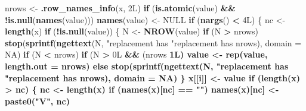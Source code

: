\documentclass[]{book}
\newenvironment{Shaded}{\begin{snugshade}}{\end{snugshade}}
\newcommand{\ControlFlowTok}[1]{\textcolor[rgb]{0.13,0.29,0.53}{\textbf{#1}}}
\newcommand{\DataTypeTok}[1]{\textcolor[rgb]{0.13,0.29,0.53}{#1}}
\newcommand{\KeywordTok}[1]{\textcolor[rgb]{0.13,0.29,0.53}{\textbf{#1}}}
\newcommand{\NormalTok}[1]{#1}
\newcommand{\OperatorTok}[1]{\textcolor[rgb]{0.81,0.36,0.00}{\textbf{#1}}}
\newcommand{\OtherTok}[1]{\textcolor[rgb]{0.56,0.35,0.01}{#1}}
\newcommand{\StringTok}[1]{\textcolor[rgb]{0.31,0.60,0.02}{#1}}
\begin{document}
\begin{Shaded}
\begin{Highlighting}[]
\NormalTok{nrows <-}\StringTok{ }\KeywordTok{.row_names_info}\NormalTok{(x, 2L)}
  \ControlFlowTok{if}\NormalTok{ (}\KeywordTok{is.atomic}\NormalTok{(value) }\OperatorTok{&&}\StringTok{ }\OperatorTok{!}\KeywordTok{is.null}\NormalTok{(}\KeywordTok{names}\NormalTok{(value))) }
    \KeywordTok{names}\NormalTok{(value) <-}\StringTok{ }\OtherTok{NULL}
  \ControlFlowTok{if}\NormalTok{ (}\KeywordTok{nargs}\NormalTok{() }\OperatorTok{<}\StringTok{ }\NormalTok{4L) \{}
\NormalTok{    nc <-}\StringTok{ }\KeywordTok{length}\NormalTok{(x)}
    \ControlFlowTok{if}\NormalTok{ (}\OperatorTok{!}\KeywordTok{is.null}\NormalTok{(value)) \{}
\NormalTok{      N <-}\StringTok{ }\KeywordTok{NROW}\NormalTok{(value)}
      \ControlFlowTok{if}\NormalTok{ (N }\OperatorTok{>}\StringTok{ }\NormalTok{nrows) }
        \KeywordTok{stop}\NormalTok{(}\KeywordTok{sprintf}\NormalTok{(}\KeywordTok{ngettext}\NormalTok{(N, }\StringTok{"replacement has %
          \StringTok{"replacement has %
\NormalTok{          nrows), }\DataTypeTok{domain =} \OtherTok{NA}\NormalTok{)}
      \ControlFlowTok{if}\NormalTok{ (N }\OperatorTok{<}\StringTok{ }\NormalTok{nrows) }
        \ControlFlowTok{if}\NormalTok{ (N }\OperatorTok{>}\StringTok{ }\NormalTok{0L }\OperatorTok{&&}\StringTok{ }\NormalTok{(nrows}\OperatorTok{%
\StringTok{          }\NormalTok{1L) }
\NormalTok{          value <-}\StringTok{ }\KeywordTok{rep}\NormalTok{(value, }\DataTypeTok{length.out =}\NormalTok{ nrows)}
        \ControlFlowTok{else} \KeywordTok{stop}\NormalTok{(}\KeywordTok{sprintf}\NormalTok{(}\KeywordTok{ngettext}\NormalTok{(N, }\StringTok{"replacement has %
          \StringTok{"replacement has %
\NormalTok{          nrows), }\DataTypeTok{domain =} \OtherTok{NA}\NormalTok{)}
\NormalTok{    \}}
\NormalTok{    x[[i]] <-}\StringTok{ }\NormalTok{value}
    \ControlFlowTok{if}\NormalTok{ (}\KeywordTok{length}\NormalTok{(x) }\OperatorTok{>}\StringTok{ }\NormalTok{nc) \{}
\NormalTok{      nc <-}\StringTok{ }\KeywordTok{length}\NormalTok{(x)}
      \ControlFlowTok{if}\NormalTok{ (}\KeywordTok{names}\NormalTok{(x)[nc] }\OperatorTok{==}\StringTok{ ""}\NormalTok{) }
        \KeywordTok{names}\NormalTok{(x)[nc] <-}\StringTok{ }\KeywordTok{paste0}\NormalTok{(}\StringTok{"V"}\NormalTok{, nc)}
}}}}}
\end{Highlighting}
\end{Shaded}
\end{document}
